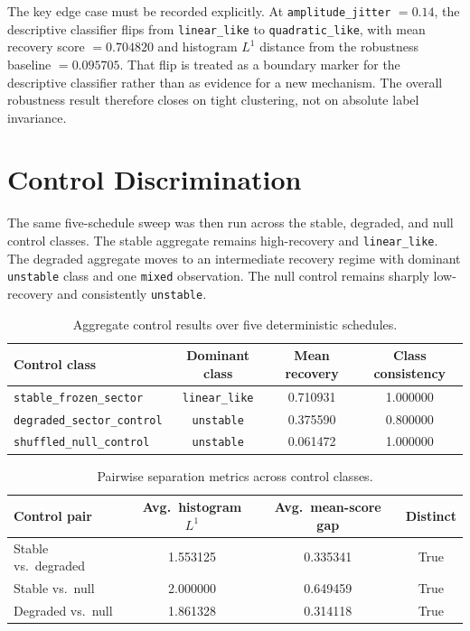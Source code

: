 \documentclass[11pt]{article}
\begin{document}
The key edge case must be recorded explicitly. At \texttt{amplitude\_jitter} $= 0.14$, the descriptive classifier flips from \texttt{linear\_like} to \texttt{quadratic\_like}, with mean recovery score $= 0.704820$ and histogram $L^1$ distance from the robustness baseline $= 0.095705$. That flip is treated as a boundary marker for the descriptive classifier rather than as evidence for a new mechanism. The overall robustness result therefore closes on tight clustering, not on absolute label invariance.

\section{Control Discrimination}

The same five-schedule sweep was then run across the stable, degraded, and null control classes. The stable aggregate remains high-recovery and \texttt{linear\_like}. The degraded aggregate moves to an intermediate recovery regime with dominant \texttt{unstable} class and one \texttt{mixed} observation. The null control remains sharply low-recovery and consistently \texttt{unstable}.

\begin{table}[t]
\centering
\small
\begin{tabular}{@{}p{2.15in}ccc@{}}
\toprule
Control class & Dominant class & Mean recovery & Class consistency \\
\midrule
\texttt{stable\_frozen\_sector} & \texttt{linear\_like} & 0.710931 & 1.000000 \\
\texttt{degraded\_sector\_control} & \texttt{unstable} & 0.375590 & 0.800000 \\
\texttt{shuffled\_null\_control} & \texttt{unstable} & 0.061472 & 1.000000 \\
\bottomrule
\end{tabular}
\caption{Aggregate control results over five deterministic schedules.}
\label{tab:controls}
\end{table}

\begin{table}[t]
\centering
\small
\begin{tabular}{@{}p{2.45in}ccc@{}}
\toprule
Control pair & Avg.\ histogram $L^1$ & Avg.\ mean-score gap & Distinct \\
\midrule
Stable vs.\ degraded & 1.553125 & 0.335341 & True \\
Stable vs.\ null & 2.000000 & 0.649459 & True \\
Degraded vs.\ null & 1.861328 & 0.314118 & True \\
\bottomrule
\end{tabular}
\caption{Pairwise separation metrics across control classes.}
\label{tab:pairwise}
\end{table}
\end{document}
